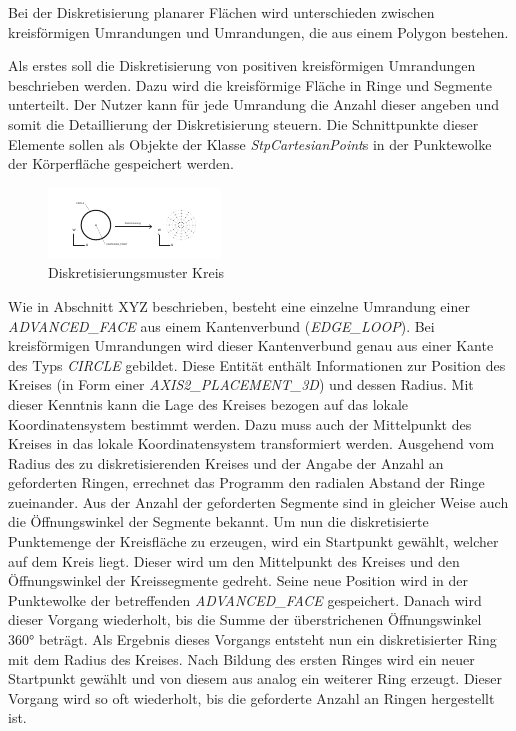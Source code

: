 Bei der Diskretisierung planarer Flächen wird unterschieden zwischen kreisförmigen Umrandungen und Umrandungen, die aus einem Polygon bestehen.

Als erstes soll die Diskretisierung von positiven kreisförmigen Umrandungen beschrieben werden. Dazu wird die kreisförmige Fläche in Ringe und Segmente unterteilt. Der Nutzer kann für jede Umrandung die Anzahl dieser angeben und somit die Detaillierung der Diskretisierung steuern. Die Schnittpunkte dieser Elemente sollen als Objekte der Klasse \textit{StpCartesianPoint}s in der Punktewolke der Körperfläche gespeichert werden. 

\begin{figure}[h]
	\centering
	
	\includegraphics[width=0.7\linewidth]{img/discretcircle.pdf}
	
	\caption{Diskretisierungsmuster Kreis}
	\label{fig:discretecircle}
	
\end{figure}

Wie in Abschnitt XYZ beschrieben, besteht eine einzelne Umrandung einer \textit{ADVANCED\_FACE} aus einem Kantenverbund (\textit{EDGE\_LOOP}). Bei kreisförmigen Umrandungen wird dieser Kantenverbund genau aus einer Kante des Typs \textit{CIRCLE} gebildet. Diese Entität enthält Informationen zur Position des Kreises (in Form einer \textit{AXIS2\_PLACEMENT\_3D}) und dessen Radius.
Mit dieser Kenntnis kann die Lage des Kreises bezogen auf das lokale Koordinatensystem bestimmt werden. Dazu muss auch der Mittelpunkt des Kreises in das lokale Koordinatensystem transformiert werden. Ausgehend vom Radius des zu diskretisierenden Kreises und der Angabe der Anzahl an geforderten Ringen, errechnet das Programm den radialen Abstand der Ringe zueinander. Aus der Anzahl der geforderten Segmente sind in gleicher Weise auch die Öffnungswinkel der Segmente bekannt. Um nun die diskretisierte Punktemenge der Kreisfläche zu erzeugen, wird ein Startpunkt gewählt, welcher auf dem Kreis liegt. Dieser wird um den Mittelpunkt des Kreises und den Öffnungswinkel der Kreissegmente gedreht. Seine neue Position wird in der Punktewolke der betreffenden \textit{ADVANCED\_FACE} gespeichert. Danach wird dieser Vorgang wiederholt, bis die Summe der überstrichenen Öffnungswinkel 360° beträgt. Als Ergebnis dieses Vorgangs entsteht nun ein diskretisierter Ring mit dem Radius des Kreises. Nach Bildung des ersten Ringes wird ein neuer Startpunkt gewählt und von diesem aus analog ein weiterer Ring erzeugt. Dieser Vorgang wird so oft wiederholt, bis die geforderte Anzahl an Ringen hergestellt ist. 

